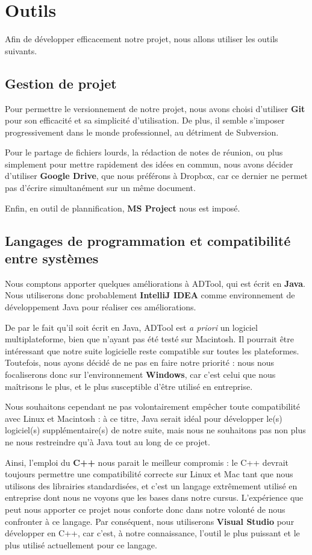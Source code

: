 \chapter{Outils}
	Afin de développer efficacement notre projet, nous allons utiliser les outils suivants.
	 
	\section{Gestion de projet}
		Pour permettre le versionnement de notre projet, nous avons choisi d'utiliser {\bf Git} pour son efficacité et sa simplicité d'utilisation. De plus, il semble s'imposer progressivement dans le monde professionnel, au détriment de Subversion.
		
		Pour le partage de fichiers lourds, la rédaction de notes de réunion, ou plus simplement pour mettre rapidement des idées en commun, nous avons décider d'utiliser {\bf Google Drive}, que nous préférons à Dropbox, car ce dernier ne permet pas d'écrire simultanément sur un même document.

		Enfin, en outil de plannification, {\bf MS Project} nous est imposé.

	\section{Langages de programmation et compatibilité entre systèmes}
		Nous comptons apporter quelques améliorations à ADTool, qui est écrit en {\bf Java}. Nous utiliserons donc probablement {\bf IntelliJ IDEA} comme environnement de développement Java pour réaliser ces améliorations.
		
		De par le fait qu'il soit écrit en Java, ADTool est {\itshape a priori} un logiciel multiplateforme, bien que n'ayant pas été testé sur Macintosh. Il pourrait être intéressant que notre suite logicielle reste compatible sur toutes les plateformes. Toutefois, nous ayons décidé de ne pas en faire notre priorité : nous nous focaliserons donc sur l'environnement {\bf Windows}, car c'est celui que nous maîtrisons le plus, et le plus susceptible d'être utilisé en entreprise.
		
		Nous souhaitons cependant ne pas volontairement empêcher toute compatibilité avec Linux et Macintosh : à ce titre, Java serait idéal pour développer le(s) logiciel(s) supplémentaire(s) de notre suite, mais nous ne souhaitons pas non plus ne nous restreindre qu'à Java tout au long de ce projet.
		
		Ainsi, l'emploi du {\bf C++} nous parait le meilleur compromis : le C++ devrait toujours permettre une compatibilité correcte sur Linux et Mac tant que nous utilisons des librairies standardisées, et c'est un langage extrêmement utilisé en entreprise dont nous ne voyons que les bases dans notre cursus. L'expérience que peut nous apporter ce projet nous conforte donc dans notre volonté de nous confronter à ce langage. Par conséquent, nous utiliserons {\bf Visual Studio} pour développer en C++, car c'est, à notre connaissance, l'outil le plus puissant et le plus utilisé actuellement pour ce langage.

